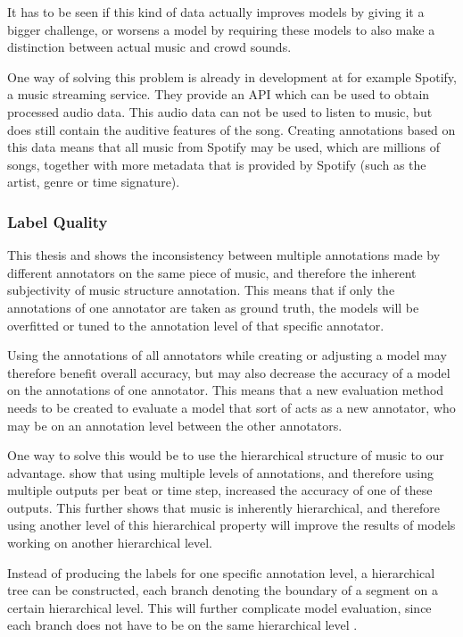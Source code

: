 It has to be seen if this kind of data actually improves models by giving it a bigger challenge, or worsens a model by requiring these models to also make a distinction between actual music and crowd sounds.

One way of solving this problem is already in development at for example Spotify, a music streaming service. They provide an API which can be used to obtain processed audio data. This audio data can not be used to listen to music, but does still contain the auditive features of the song. Creating annotations based on this data means that all music from Spotify may be used, which are millions of songs, together with more metadata that is provided by Spotify (such as the artist, genre or time signature).

\subsubsection{Label Quality}
\label{sec:label_qual}
This thesis and \textcite{Jesperthesis} shows the inconsistency between multiple annotations made by different annotators on the same piece of music, and therefore the inherent subjectivity of music structure annotation. This means that if only the annotations of one annotator are taken as ground truth, the models will be overfitted or tuned to the annotation level of that specific annotator. 

Using the annotations of all annotators while creating or adjusting a model may therefore benefit overall accuracy, but may also decrease the accuracy of a model on the annotations of one annotator. This means that a new evaluation method needs to be created to evaluate a model that sort of acts as a new annotator, who may be on an annotation level between the other annotators.

One way to solve this would be to use the hierarchical structure of music to our advantage. \textcite{Grill2015music2} show that using multiple levels of annotations, and therefore using multiple outputs per beat or time step, increased the accuracy of one of these outputs. This further shows that music is inherently hierarchical, and therefore using another level of this hierarchical property will improve the results of models working on another hierarchical level.

Instead of producing the labels for one specific annotation level, a hierarchical tree can be constructed, each branch denoting the boundary of a segment on a certain hierarchical level. This will further complicate model evaluation, since each branch does not have to be on the same hierarchical level \cite{Sun2001hierarchical,Almars2018evaluation}.

